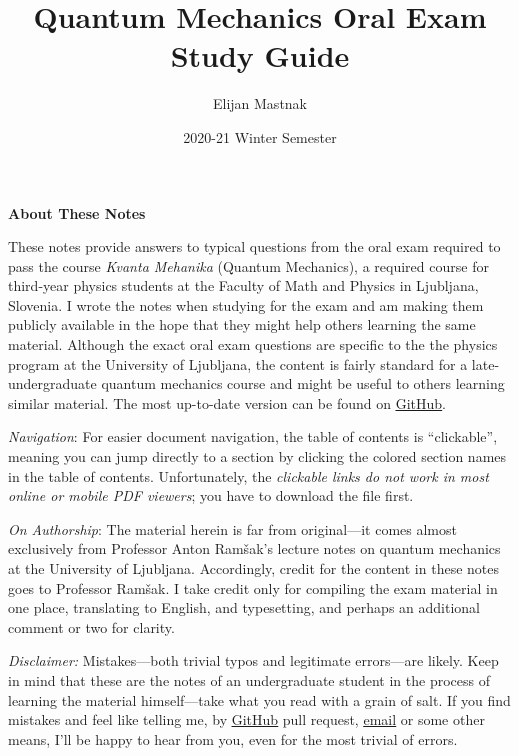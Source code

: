 \documentclass[11pt, a4paper]{article}
\begin{document}
\title{Quantum Mechanics Oral Exam Study Guide}
\author{Elijan Mastnak}
\date{2020-21 Winter Semester}
\maketitle

\thispagestyle{empty}  %

\begin{center}
\textbf{About These Notes}
\end{center}
These notes provide answers to typical questions from the oral exam required to pass the course \textit{Kvanta Mehanika} (Quantum Mechanics), a required course for third-year physics students at the Faculty of Math and Physics in Ljubljana, Slovenia. I wrote the notes when studying for the exam and am making them publicly available in the hope that they might help others learning the same material. Although the exact oral exam questions are specific to the the physics program at the University of Ljubljana, the content is fairly standard for a late-undergraduate quantum mechanics course and might be useful to others learning similar material. The most up-to-date version can be found on \href{https://github.com/ejmastnak/fmf/tree/main/quantum-mechanics}{\underline{GitHub}}.

\vspace{2mm}
\textit{Navigation}: For easier document navigation, the table of contents is ``clickable'', meaning you can jump directly to a section by clicking the colored section names in the table of contents. Unfortunately, the \textit{clickable links do not work in most online or mobile PDF viewers}; you have to download the file first.

\vspace{2mm}
\textit{On Authorship}: The material herein is far from original---it comes almost exclusively from Professor Anton Ram\v{s}ak's lecture notes on quantum mechanics at the University of Ljubljana. Accordingly, credit for the content in these notes goes to Professor Ram\v{s}ak. I take credit only for compiling the exam material in one place, translating to English, and typesetting, and perhaps an additional comment or two for clarity.

\vspace{2mm}
\textit{Disclaimer:} Mistakes---both trivial typos and legitimate errors---are likely. Keep in mind that these are the notes of an undergraduate student in the process of learning the material himself---take what you read with a grain of salt. If you find mistakes and feel like telling me, by \href{https://github.com/ejmastnak/fmf}{\underline{GitHub}} pull request, \href{mailto:ejmastnak@gmail.com}{\underline{email}} or some other means, I'll be happy to hear from you, even for the most trivial of errors.
\end{document}
